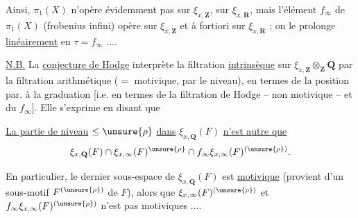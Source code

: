 Ainsi, $\pi_1(X)$ n'opère évidemment pas sur $\xi_{x,\mathbf Z}$,  sur $\xi_{x,\mathbf R}$, mais l'élément $f_\infty$ de $\pi_1(X)$ (frobenius infini) opère sur $\xi_{x,\mathbf Z}$ et à fortiori sur $\xi_{x,\mathbf R}$ ; on le prolonge \uline{linéairement} en $\tau=f_\infty$ ....

\uline{N.B.} La \uline{conjecture de Hodge} interprète la filtration \uline{intrinsèque} sur  $\xi_{x,\mathbf Z}\otimes_{\mathbf Z}\mathbf Q$  par la filtration arithmétique ($=$ motivique, par le niveau), en termes de la position par. à la graduation [i.e. en termes de la filtration de Hodge -- non motivique -- et du $f_\infty$]. Elle s'exprime en disant que


\uline{La partie de niveau} $\leq\unsure{\rho}$ \uline{dans} $\xi_{x,\mathbf Q}(F)$ \uline{n'est autre que}
\[
\xi_{x,\mathbf Q}(F)\cap\xi_{x,\infty}(F)^{\unsure{\rho}}\cap f_\infty\xi_{x,\infty}(F)^{(\unsure{\rho})}.
\]

En particulier, le dernier sous-espace de $\xi_{x,\mathbf Q}(F)$ est \uline{motivique} (provient d'un sous-motif $F^{(\unsure{\rho})}$ de $F$), alors que $\xi_{x,\infty}(F)^{(\unsure{\rho})}$ et $f_\infty\xi_{x,\infty}(F)^{(\unsure{\rho})}$ n'est pas motiviques .... 

